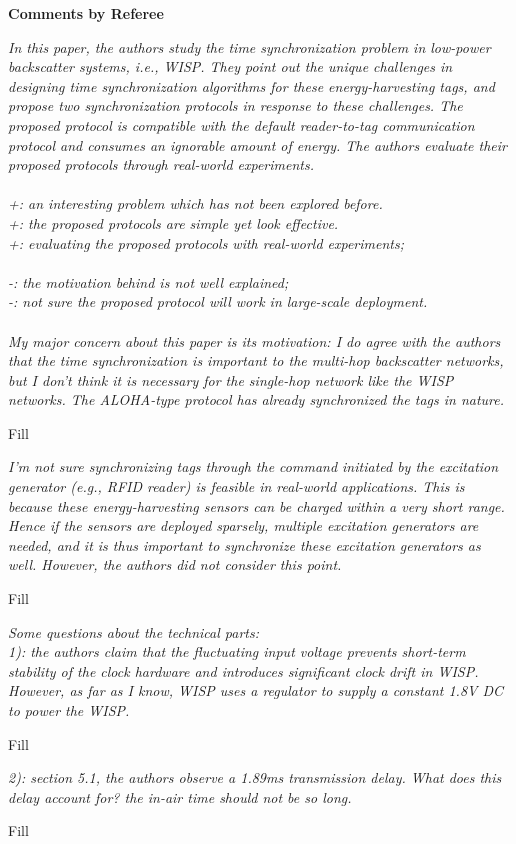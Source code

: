 \documentclass[10pt]{article}
\newcommand{\referee}[1]{{\item \color{OliveGreen} \emph{{#1}}}}
\newcommand{\response}[1]{{\color{blue} #1}}
\newcounter{refereeCounter}
\newenvironment{responses}{%
\refstepcounter{refereeCounter}%
\textbf{\large Comments by Referee \therefereeCounter}
\begin{enumerate}%
\renewcommand{\labelenumi}{\textbf{[R\therefereeCounter :\,\arabic{enumi}]}} %
}{\end{enumerate}}
\begin{document}
\begin{responses}
	
\referee{In this paper, the authors study the time synchronization problem in low-power backscatter systems, i.e., WISP. They point out the unique challenges in designing time synchronization algorithms for these energy-harvesting tags, and propose two synchronization protocols in response to these challenges. The proposed protocol is compatible with the default reader-to-tag communication protocol and consumes an ignorable amount of energy. The authors evaluate their proposed protocols through real-world experiments. \\
\\
+: an interesting problem which has not been explored before. \\
+: the proposed protocols are simple yet look effective. \\
+: evaluating the proposed protocols with real-world experiments; \\
\\		
-: the motivation behind is not well explained; \\
-: not sure the proposed protocol will work in large-scale deployment. \\
\\
My major concern about this paper is its motivation: I do agree with the authors that the time synchronization is important to the multi-hop backscatter networks, but I don’t think it is necessary for the single-hop network like the WISP networks. The ALOHA-type protocol has already synchronized the tags in nature. 
}
	
\response{
	Fill
}
	
\referee{I’m not sure synchronizing tags through the command initiated by the 
excitation generator (e.g., RFID reader) is feasible in real-world applications. This is because these energy-harvesting sensors can be charged within a very short range. Hence if the sensors are deployed sparsely, multiple excitation generators are needed, and it is thus important to synchronize these excitation generators as well. However, the authors did not consider this point.
}
	
\response{
	Fill
}
	
\referee{Some questions about the technical parts: \\
1): the authors claim that the fluctuating input voltage prevents short-term stability of the clock hardware and introduces significant clock drift in WISP. However, as far as I know, WISP uses a regulator to supply a constant 1.8V DC to power the WISP.}
	
\response{
	Fill
}
	
\referee{2): section 5.1, the authors observe a 1.89ms transmission delay. What does this delay account for? the in-air time should not be so long.
}
	
\response{
	Fill
}
	
\end{responses}
\end{document}
